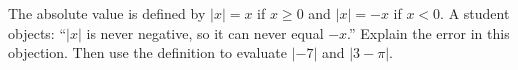 The absolute value is defined by $|x|=x$ if $x\ge0$ and $|x|=-x$ if $x<0$. A student objects: ``$|x|$ is never negative, so it can never equal $-x$.'' Explain the error in this objection. Then use the definition to evaluate $|-7|$ and $|3-\pi|$.
